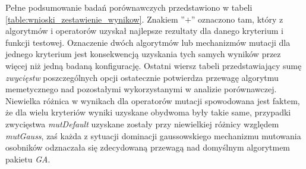 \par
Pełne podsumowanie badań porównawczych przedstawiono w tabeli \ref{table:wnioski_zestawienie_wynikow}. Znakiem ''$+$'' oznaczono tam, który z algorytmów i operatorów uzyskał najlepsze rezultaty dla danego kryterium i funkcji testowej. Oznaczenie dwóch algorytmów lub mechanizmów mutacji dla jednego kryterium jest konsekwencją uzyskania tych samych wyników przez więcej niż jedną badaną konfigurację. Ostatni wiersz tabeli przedstawiający sumę \emph{zwycięstw} poszczególnych opcji ostatecznie potwierdza przewagę algorytmu memetycznego nad pozostałymi wykorzystanymi w analizie porównawczej. Niewielka różnica w wynikach dla operatorów mutacji spowodowana jest faktem, że dla wielu kryteriów wyniki uzyskane obydwoma były takie same, przypadki zwycięstwa \emph{mutDefault} uzyskane zostały przy niewielkiej różnicy względem \emph{mutGauss}, zaś każda z sytuacji dominacji gaussowskiego mechanizmu mutowania osobników odznaczała się zdecydowaną przewagą nad domyślnym algorytmem pakietu \emph{GA}.
 


